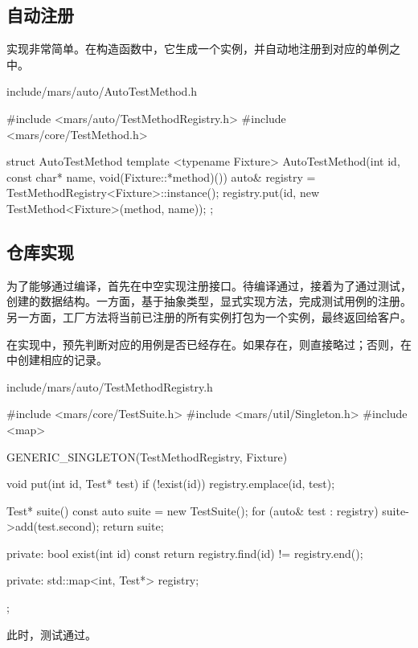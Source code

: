 \begin{content}
\subsection{自动注册}

实现非常简单。在构造函数中，它生成一个实例，并自动地注册到对应的单例之中。

\begin{nodiff}{include/mars/auto/AutoTestMethod.h}
 \begin{c++}
#include <mars/auto/TestMethodRegistry.h>
#include <mars/core/TestMethod.h>

struct AutoTestMethod {
  template <typename Fixture>
  AutoTestMethod(int id, const char* name, void(Fixture::*method)()) {
    auto& registry = TestMethodRegistry<Fixture>::instance();
    registry.put(id, new TestMethod<Fixture>(method, name));
  }
};
 \end{c++}
\end{nodiff}

\subsection{仓库实现}

为了能够通过编译，首先在中空实现注册接口。待编译通过，接着为了通过测试，创建的数据结构。一方面，基于抽象类型，显式实现方法，完成测试用例的注册。另一方面，工厂方法将当前已注册的所有实例打包为一个实例，最终返回给客户。

在实现中，预先判断对应的用例是否已经存在。如果存在，则直接略过；否则，在中创建相应的记录。

\begin{nodiff}{include/mars/auto/TestMethodRegistry.h}
 \begin{c++}
#include <mars/core/TestSuite.h>
#include <mars/util/Singleton.h>
#include <map>

GENERIC_SINGLETON(TestMethodRegistry, Fixture) {
  void put(int id, Test* test) {
    if (!exist(id)) {
      registry.emplace(id, test);
    }
  }

  Test* suite() const {
    auto suite = new TestSuite();
    for (auto& test : registry) {
      suite->add(test.second);
    }
    return suite;
  }

private:
  bool exist(int id) const {
    return registry.find(id) != registry.end();
  }

private:
  std::map<int, Test*> registry;
};
 \end{c++}
\end{nodiff}

此时，测试通过。

\end{content}


